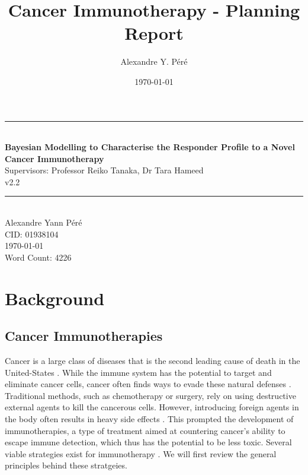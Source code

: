 \documentclass[11pt]{article}
\title{Cancer Immunotherapy - Planning Report}
\author{Alexandre Y. Péré }
\date{\today}
\begin{document}
\begin{titlepage}
    \newcommand{\HRule}{\rule{\linewidth}{0.5mm}}
    \begin{center}
        \HRule \\[0.4cm]
    { \LARGE \bfseries Bayesian Modelling to Characterise the Responder Profile to a  Novel Cancer Immunotherapy\\[0.55cm] }
    { \large Supervisors: Professor Reiko Tanaka, Dr Tara Hameed} \\
    v2.2
    \\[0.4cm]
    \HRule \\[0.5cm]
    { \large Alexandre Yann Péré \\[0.1cm]
    CID: 01938104  \\[0.1cm]
    \today \\ [0.1cm]
    \vspace{10pt}
    Word Count: 4226}
    \end{center}
\end{titlepage}

\tableofcontents


%

\pagebreak 
\section{Background}\label{sec:specs}

\subsection{Cancer Immunotherapies}
Cancer is a large class of diseases that is the second leading cause of death in the United-States \cite{nchs}. While the immune system has the potential to target and eliminate cancer cells, cancer often finds ways to evade these natural defenses \cite{EvasionMech}. Traditional methods, such as chemotherapy or surgery, rely on using destructive external agents to kill the cancerous cells. However, introducing foreign agents in the body often results in heavy side effects \cite{oncologyTreatRev}. This prompted the development of immunotherapies, a type of treatment aimed at countering cancer's ability to escape immune detection, which thus has the potential to be less toxic. Several viable strategies exist for immunotherapy \cite{ReviewCPI}. We will first review the general principles behind these stratgeies.
\end{document}
